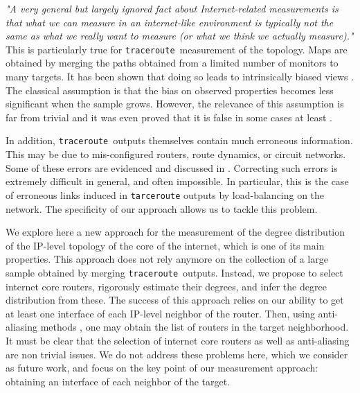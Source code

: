 \documentclass[conference]{IEEEtran}
\newcommand{\traceroute}{{\tt traceroute}}
\begin{document}
{\em "A very general but largely ignored fact about Internet-related measurements is that what we can measure in an internet-like environment is typically not the same as what we really want to measure (or what we think we actually measure)."}\cite{willinger}
This is particularly true for \traceroute\ measurement of the topology. Maps are obtained by merging the paths obtained from a limited number of monitors to many targets. It has been shown that doing so leads to intrinsically biased views \cite{DBLP:conf/infocom/LakhinaBCX03,DBLP:journals/jacm/AchlioptasCKM09,DBLP:journals/tcs/DallAstaABVV06,DBLP:conf/infocom/GuillaumeL05,DBLP:journals/cn/GuillaumeLM06}. The classical assumption is that the bias on observed properties becomes less significant when the sample grows. However, the relevance of this assumption is far from trivial and it was even proved that it is false in some cases at least \cite{DBLP:conf/infocom/LatapyM08}.

In addition, \traceroute\ outputs themselves contain much erroneous information. This may be due to mis-configured routers, route dynamics, or circuit networks. Some of these errors are evidenced and discussed in \cite{willinger,DBLP:conf/sigcomm/SherwoodBS08,DBLP:journals/ton/SpringMWA04,DBLP:journals/cn/VigerACMLFT08,DBLP:conf/imc/AugustinCOVFLMT06}. Correcting such errors is extremely difficult in general, and often impossible. In particular, this is the case of erroneous links induced in \texttt{tarceroute} outputs by load-balancing on the network. The specificity of our approach allows us to tackle this problem.

We explore here a new approach for the measurement of the degree distribution of the IP-level topology of the core of the internet, which is one of its main properties.
This approach does not rely anymore on the collection of a large sample obtained by merging \traceroute\ outputs. Instead, we propose to select internet core routers, rigorously estimate their degrees, and infer the degree distribution from these. The success of this approach relies on our ability to get at least one interface of each IP-level neighbor of the router. Then, using anti-aliasing methods \cite{spring04how,DBLP:conf/imc/BenderSS08,DBLP:conf/sigcomm/SherwoodBS08,DBLP:journals/ton/SpringMWA04}, one may obtain the list of routers in the target neighborhood.
It must be clear that the selection of internet core routers as well as anti-aliasing are non trivial issues. We do not address these problems here, which we consider as future work, and focus on the key point of our measurement approach: obtaining an interface of each neighbor of the target.
\end{document}
